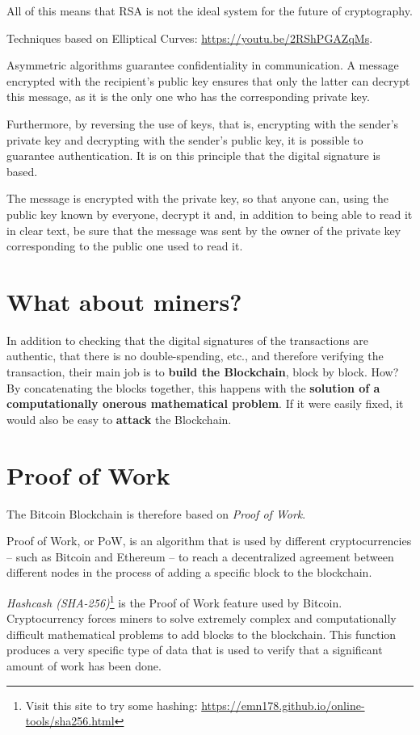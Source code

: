 All of this means that RSA is not the ideal system for the future of cryptography.

Techniques based on Elliptical Curves: \url{https://youtu.be/2RShPGAZqMs}.

Asymmetric algorithms guarantee confidentiality in communication. A message encrypted with the recipient's public key ensures that only the latter can decrypt this message, as it is the only one who has the corresponding private key.

Furthermore, by reversing the use of keys, that is, encrypting with the sender's private key and decrypting with the sender's public key, it is possible to guarantee authentication. It is on this principle that the digital signature is based.

The message is encrypted with the private key, so that anyone can, using the public key known by everyone, decrypt it and, in addition to being able to read it in clear text, be sure that the message was sent by the owner of the private key corresponding to the public one used to read it.

\section{What about miners?}

In addition to checking that the digital signatures of the transactions are authentic, that there is no double-spending, etc., and therefore verifying the transaction, their main job is to \textbf{build the Blockchain}, block by block. How? By concatenating the blocks together, this happens with the \textbf{solution of a computationally onerous mathematical problem}. If it were easily fixed, it would also be easy to \textbf{attack} the Blockchain.

\section{Proof of Work}

The Bitcoin Blockchain is therefore based on \textit{Proof of Work}.

Proof of Work, or PoW, is an algorithm that is used by different cryptocurrencies -- such as Bitcoin and Ethereum -- to reach a decentralized agreement between different nodes in the process of adding a specific block to the blockchain.

\textit{Hashcash (SHA-256)}\footnote{Visit this site to try some hashing: \url{https://emn178.github.io/online-tools/sha256.html}} is the Proof of Work feature used by Bitcoin. Cryptocurrency forces miners to solve extremely complex and computationally difficult mathematical problems to add blocks to the blockchain. This function produces a very specific type of data that is used to verify that a significant amount of work has been done.

